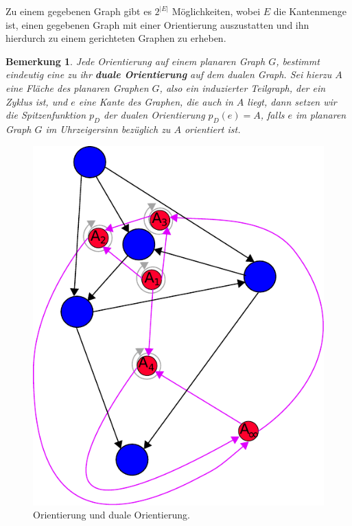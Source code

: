 \documentclass[11pt,a4paper,leqno]{report}
\newtheorem{remark}[theorem]{Bemerkung}
\numberwithin{equation}{chapter}
\begin{document}
\noindent
 Zu einem gegebenen Graph gibt es $2^{|E|}$ M\"oglichkeiten, wobei $E$ die Kanten\-menge ist, einen gegebenen Graph mit einer Orientierung auszustatten und ihn hierdurch zu einem gerichteten Graphen zu erheben.
 \begin{remark}
 	Jede Orientierung auf einem planaren Graph $G$, bestimmt eindeutig eine zu ihr \textbf{duale Orientierung} auf dem dualen Graph. Sei hierzu $A$ eine Fl\"ache des planaren Graphen $G$, also ein induzierter Teilgraph, der ein Zyklus ist, und $e$ eine Kante des Graphen, die auch in $A$ liegt, dann setzen wir die Spitzenfunktion $p_D$ der dualen Orientierung $p_D(e) = A$, falls $e$ im planaren Graph $G$ im Uhrzeigersinn bez\"uglich zu $A$ orientiert ist.
 \end{remark}
\begin{figure}[H]
	\begin{center}
		\includegraphics[scale=0.4]{Abbildungen/graph_1_dual_orient.pdf}
		\caption{Orientierung und duale Orientierung.}
	\end{center}
\end{figure}
\noindent
\end{document}
